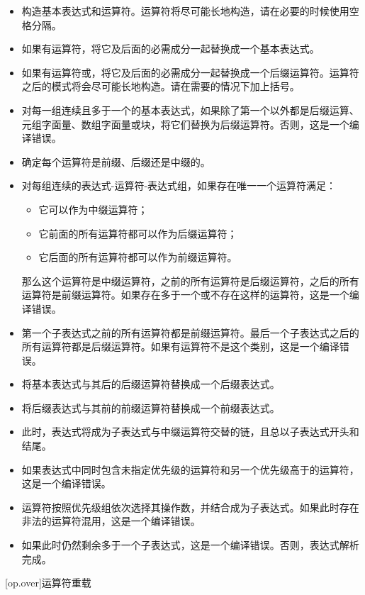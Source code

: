\begin{itemize}
    \item 构造基本表达式和运算符。运算符将尽可能长地构造，请在必要的时候使用空格分隔。
    \item 如果有运算符，将它及后面的必需成分一起替换成一个基本表达式。
    \item 如果有运算符或，将它及后面的必需成分一起替换成一个后缀运算符。\enternote {}运算符之后的模式将会尽可能长地构造。请在需要的情况下加上括号。\exitnote
    \item 对每一组连续且多于一个的基本表达式，如果除了第一个以外都是后缀运算、元组字面量、数组字面量或块，将它们替换为后缀运算符。否则，这是一个编译错误。
    \item 确定每个运算符是前缀、后缀还是中缀的。
    \item 对每组连续的表达式-运算符-表达式组，如果存在唯一一个运算符满足：
    \begin{itemize}
        \item 它可以作为中缀运算符；
        \item 它前面的所有运算符都可以作为后缀运算符；
        \item 它后面的所有运算符都可以作为前缀运算符。
    \end{itemize}
    那么这个运算符是中缀运算符，之前的所有运算符是后缀运算符，之后的所有运算符是前缀运算符。如果存在多于一个或不存在这样的运算符，这是一个编译错误。
    \item 第一个子表达式之前的所有运算符都是前缀运算符。最后一个子表达式之后的所有运算符都是后缀运算符。如果有运算符不是这个类别，这是一个编译错误。
    \item 将基本表达式与其后的后缀运算符替换成一个后缀表达式。
    \item 将后缀表达式与其前的前缀运算符替换成一个前缀表达式。
    \item 此时，表达式将成为子表达式与中缀运算符交替的链，且总以子表达式开头和结尾。
    \item 如果表达式中同时包含未指定优先级的运算符和另一个优先级高于\tcode{==}的运算符，这是一个编译错误。
    \item 运算符按照优先级组依次选择其操作数，并结合成为子表达式。如果此时存在非法的运算符混用，这是一个编译错误。
    \item 如果此时仍然剩余多于一个子表达式，这是一个编译错误。否则，表达式解析完成。
\end{itemize}

[op.over]{运算符重载}

